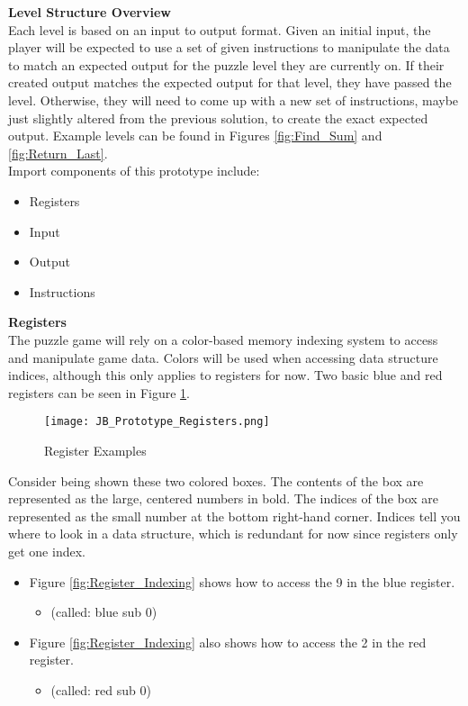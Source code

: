 \textbf{Level Structure Overview}\\
Each level is based on an input to output format. Given an initial input, the player
will be expected to use a set of given instructions to manipulate the data to
match an expected output for the puzzle level they are currently on. If their
created output matches the expected output for that level, they have passed the level.
Otherwise, they will need to come up with a new set of instructions, maybe just
slightly altered from the previous solution, to create the exact expected output.
Example levels can be found in Figures \ref{fig:Find_Sum} and \ref{fig:Return_Last}.\\

Import components of this prototype include:
\begin{itemize}
	\item Registers
	\item Input
	\item Output
	\item Instructions
\end{itemize}

\textbf{Registers}\\
The puzzle game will rely on a color-based memory indexing system to access and
manipulate game data. Colors will be used when accessing data structure indices,
although this only applies to registers for now. Two basic blue and red registers
can be seen in Figure \ref{fig:Register_Examples}.\\

\begin{figure}[!hb]
	\caption{Register Examples}
	\label{fig:Register_Examples}
	\centering
	\texttt{[image: JB\_Prototype\_Registers.png]}
\end{figure}

Consider being shown these two colored boxes. The contents of the box are represented
as the large, centered numbers in bold. The indices of the box are represented as the
small number at the bottom right-hand corner. Indices tell you where to look in a
data structure, which is redundant for now since registers only get one index.\\

\begin{itemize}
	\item Figure \ref{fig:Register_Indexing} shows how to access the 9 in the blue register.
	\begin{itemize}
		\item (called: blue sub 0)
	\end{itemize}
	\item Figure \ref{fig:Register_Indexing} also shows how to access the 2 in the red register.
	\begin{itemize}
		\item (called: red sub 0)
	\end{itemize}
\end{itemize}

